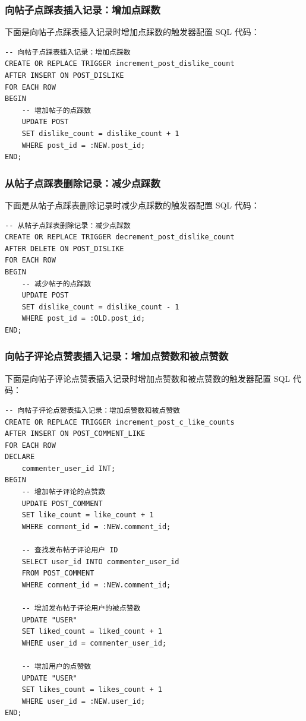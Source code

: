 \subsubsection{向帖子点踩表插入记录：增加点踩数}

下面是向帖子点踩表插入记录时增加点踩数的触发器配置 SQL 代码：

\begin{verbatim}
-- 向帖子点踩表插入记录：增加点踩数
CREATE OR REPLACE TRIGGER increment_post_dislike_count
AFTER INSERT ON POST_DISLIKE
FOR EACH ROW
BEGIN
    -- 增加帖子的点踩数
    UPDATE POST
    SET dislike_count = dislike_count + 1
    WHERE post_id = :NEW.post_id;
END;
\end{verbatim}

\subsubsection{从帖子点踩表删除记录：减少点踩数}

下面是从帖子点踩表删除记录时减少点踩数的触发器配置 SQL 代码：

\begin{verbatim}
-- 从帖子点踩表删除记录：减少点踩数
CREATE OR REPLACE TRIGGER decrement_post_dislike_count
AFTER DELETE ON POST_DISLIKE
FOR EACH ROW
BEGIN
    -- 减少帖子的点踩数
    UPDATE POST
    SET dislike_count = dislike_count - 1
    WHERE post_id = :OLD.post_id;
END;
\end{verbatim}

\subsubsection{向帖子评论点赞表插入记录：增加点赞数和被点赞数}

下面是向帖子评论点赞表插入记录时增加点赞数和被点赞数的触发器配置 SQL 代码：

\begin{verbatim}
-- 向帖子评论点赞表插入记录：增加点赞数和被点赞数
CREATE OR REPLACE TRIGGER increment_post_c_like_counts
AFTER INSERT ON POST_COMMENT_LIKE
FOR EACH ROW
DECLARE
    commenter_user_id INT;
BEGIN
    -- 增加帖子评论的点赞数
    UPDATE POST_COMMENT
    SET like_count = like_count + 1
    WHERE comment_id = :NEW.comment_id;

    -- 查找发布帖子评论用户 ID
    SELECT user_id INTO commenter_user_id
    FROM POST_COMMENT
    WHERE comment_id = :NEW.comment_id;

    -- 增加发布帖子评论用户的被点赞数
    UPDATE "USER"
    SET liked_count = liked_count + 1
    WHERE user_id = commenter_user_id;

    -- 增加用户的点赞数
    UPDATE "USER"
    SET likes_count = likes_count + 1
    WHERE user_id = :NEW.user_id;
END;
\end{verbatim}

